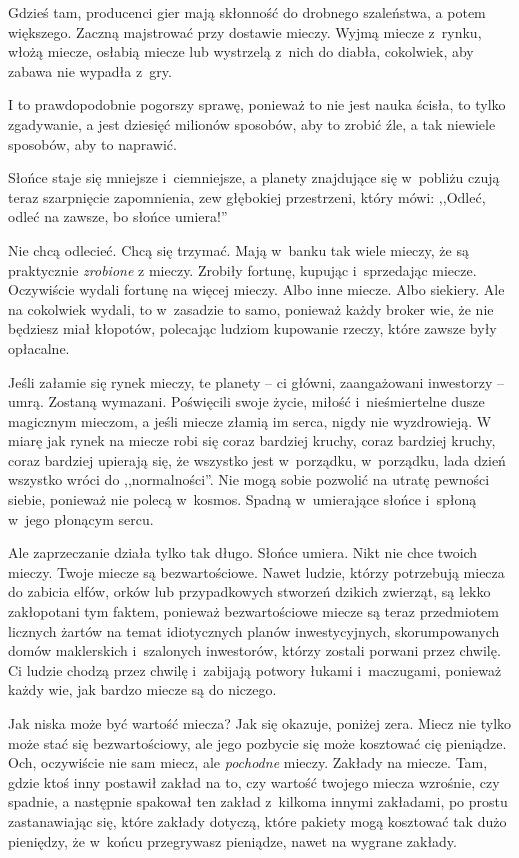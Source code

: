 \documentclass[oneside,polish,11pt,rmheadings]{mwbk}
\begin{document}
Gdzieś tam, producenci gier mają skłonność do drobnego szaleństwa, a potem większego. Zaczną majstrować przy dostawie mieczy. Wyjmą miecze z~rynku, włożą miecze, osłabią miecze lub wystrzelą z~nich do diabła, cokolwiek, aby zabawa nie wypadła z~gry.

I to prawdopodobnie pogorszy sprawę, ponieważ to nie jest nauka ścisła, to tylko zgadywanie, a jest dziesięć milionów sposobów, aby to zrobić źle, a tak niewiele sposobów, aby to naprawić.

Słońce staje się mniejsze i~ciemniejsze, a planety znajdujące się w~pobliżu czują teraz szarpnięcie zapomnienia, zew głębokiej przestrzeni, który mówi: ,,Odleć, odleć na zawsze, bo słońce umiera!''

Nie chcą odlecieć. Chcą się trzymać. Mają w~banku tak wiele mieczy, że są praktycznie \textit{zrobione }z mieczy. Zrobiły fortunę, kupując i~sprzedając miecze. Oczywiście wydali fortunę na więcej mieczy. Albo inne miecze. Albo siekiery. Ale na cokolwiek wydali, to w~zasadzie to samo, ponieważ każdy broker wie, że nie będziesz miał kłopotów, polecając ludziom kupowanie rzeczy, które zawsze były opłacalne.

Jeśli załamie się rynek mieczy, te planety -- ci główni, zaangażowani inwestorzy -- umrą. Zostaną wymazani. Poświęcili swoje życie, miłość i~nieśmiertelne dusze magicznym mieczom, a jeśli miecze złamią im serca, nigdy nie wyzdrowieją. W miarę jak rynek na miecze robi się coraz bardziej kruchy, coraz bardziej kruchy, coraz bardziej upierają się, że wszystko jest w~porządku, w~porządku, lada dzień wszystko wróci do ,,normalności''. Nie mogą sobie pozwolić na utratę pewności siebie, ponieważ nie polecą w~kosmos. Spadną w~umierające słońce i~spłoną w~jego płonącym sercu.

Ale zaprzeczanie działa tylko tak długo. Słońce umiera. Nikt nie chce twoich mieczy. Twoje miecze są bezwartościowe. Nawet ludzie, którzy potrzebują miecza do zabicia elfów, orków lub przypadkowych stworzeń dzikich zwierząt, są lekko zakłopotani tym faktem, ponieważ bezwartościowe miecze są teraz przedmiotem licznych żartów na temat idiotycznych planów inwestycyjnych, skorumpowanych domów maklerskich i~szalonych inwestorów, którzy zostali porwani przez chwilę. Ci ludzie chodzą przez chwilę i~zabijają potwory łukami i~maczugami, ponieważ każdy wie, jak bardzo miecze są do niczego.

Jak niska może być wartość miecza? Jak się okazuje, poniżej zera. Miecz nie tylko może stać się bezwartościowy, ale jego pozbycie się może kosztować cię pieniądze. Och, oczywiście nie sam miecz, ale \textit{pochodne }mieczy. Zakłady na miecze. Tam, gdzie ktoś inny postawił zakład na to, czy wartość twojego miecza wzrośnie, czy spadnie, a następnie spakował ten zakład z~kilkoma innymi zakładami, po prostu zastanawiając się, które zakłady dotyczą, które pakiety mogą kosztować tak dużo pieniędzy, że w~końcu przegrywasz pieniądze, nawet na wygrane zakłady.
\end{document}
